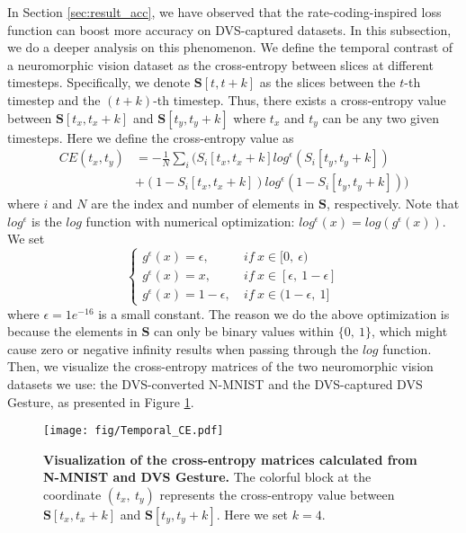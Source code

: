 \documentclass[journal,10pt,twocolumn]{IEEETran}
\begin{document}
In Section \ref{sec:result_acc}, we have observed that the rate-coding-inspired loss function can boost more accuracy on DVS-captured datasets. In this subsection, we do a deeper analysis on this phenomenon. We define the temporal contrast of a neuromorphic vision dataset as the cross-entropy between slices at different timesteps. Specifically, we denote $\pmb{S}[t,t+k]$ as the slices between the $t$-th timestep  and the $(t+k)$-th timestep. Thus, there exists a cross-entropy value between $\pmb{S}[t_x,t_x+k]$ and $\pmb{S}[t_y,t_y+k]$ where $t_x$ and $t_y$ can be any two given timesteps. Here we define the cross-entropy value as
\begin{equation}
\label{equ:temporal_CE}
\begin{aligned}
CE(t_x,t_y) &= -\frac{1}{N}\sum_i(S_i[t_x,t_x+k] log^{\epsilon}(S_i[t_y,t_y+k])\\
&+ (1-S_i[t_x,t_x+k]) log^{\epsilon}(1-S_i[t_y,t_y+k]))
\end{aligned}
\end{equation}
where $i$ and $N$ are the index and number of elements in $\pmb{S}$, respectively. Note that $log^{\epsilon}$ is the $log$ function with numerical optimization: $log^{\epsilon}(x)=log(g^{\epsilon}(x))$. We set
\begin{equation}
\label{equ:CE_log}
\begin{cases}
g^{\epsilon}(x)=\epsilon,~&if~x\in [0,~\epsilon) \\
g^{\epsilon}(x)=x,~&if~x\in [\epsilon,~1-\epsilon] \\
g^{\epsilon}(x)=1-\epsilon,~&if~x\in (1-\epsilon,~1]
\end{cases}
\end{equation}
where $\epsilon=1e^{-16}$ is a small constant. The reason we do the above optimization is because the elements in $\pmb{S}$ can only be binary values within $\{0,~1\}$, which might cause zero or negative infinity results when passing through the $log$ function. Then, we visualize the cross-entropy matrices of the two neuromorphic vision datasets we use: the DVS-converted N-MNIST and the DVS-captured DVS Gesture, as presented in Figure \ref{fig:temporal_CE}.

\begin{figure}[!htbp]
\centering     
\texttt{[image: fig/Temporal\_CE.pdf]}
\caption{\textbf{Visualization of the cross-entropy matrices calculated from N-MNIST and DVS Gesture.} The colorful block at the coordinate $(t_x,~t_y)$ represents the cross-entropy value between $\pmb{S}[t_x,t_x+k]$ and $\pmb{S}[t_y,t_y+k]$. Here we set $k=4$. } 
\label{fig:temporal_CE} 
\end{figure}
\end{document}
